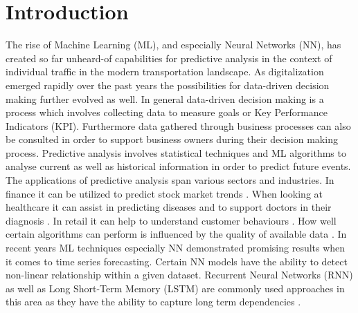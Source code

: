 %
%
% 
% 
% 

\chapter{Introduction}
\label{chap:introduction}
The rise of Machine Learning (ML), and especially Neural Networks (NN), has created so far unheard-of capabilities for predictive analysis in the context of individual traffic in the modern transportation landscape. As digitalization emerged rapidly over the past years the possibilities for data-driven decision making further evolved as well. In general data-driven decision making is a process which involves collecting data to measure goals or Key Performance Indicators (KPI). Furthermore data gathered through business processes can also be consulted in order to support business owners during their decision making process.
\newline
\newline
Predictive analysis involves statistical techniques and ML algorithms to analyse current as well as historical information in order to predict future events. The applications of predictive analysis span various sectors and industries. In finance it can be utilized to predict stock market trends \cite{stock_market}. When looking at healthcare it can assist in predicting diseases and to support doctors in their diagnosis \cite{health_care}. In retail it can help to understand customer behaviours \cite{retail}. How well certain algorithms can perform is influenced by the quality of available data \cite{data_qual}. In recent years ML techniques especially NN demonstrated promising results when it comes to time series forecasting. Certain NN models have the ability to detect non-linear relationship within a given dataset. Recurrent Neural Networks (RNN) as well as Long Short-Term Memory (LSTM) are commonly used approaches in this area as they have the ability to capture long term dependencies \cite{intro_ml_1}.
\newline
\newline

